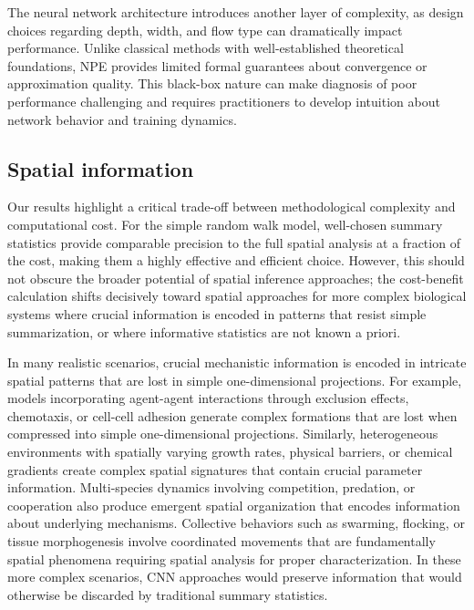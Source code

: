 \documentclass{article}
\begin{document}
The neural network architecture introduces another layer of complexity, as design choices regarding depth, width, and flow type can dramatically impact performance. Unlike classical methods with well-established theoretical foundations, NPE provides limited formal guarantees about convergence or approximation quality. This black-box nature can make diagnosis of poor performance challenging and requires practitioners to develop intuition about network behavior and training dynamics.




\subsection{Spatial information}
Our results highlight a critical trade-off between methodological complexity and computational cost. For the simple random walk model, well-chosen summary statistics provide comparable precision to the full spatial analysis at a fraction of the cost, making them a highly effective and efficient choice. However, this should not obscure the broader potential of spatial inference approaches; the cost-benefit calculation shifts decisively toward spatial approaches for more complex biological systems where crucial information is encoded in patterns that resist simple summarization, or where informative statistics are not known a priori.


In many realistic scenarios, crucial mechanistic information is encoded in intricate spatial patterns that are lost in simple one-dimensional projections. For example, models incorporating agent-agent interactions through exclusion effects, chemotaxis, or cell-cell adhesion generate complex formations that are lost when compressed into simple one-dimensional projections. Similarly, heterogeneous environments with spatially varying growth rates, physical barriers, or chemical gradients create complex spatial signatures that contain crucial parameter information. Multi-species dynamics involving competition, predation, or cooperation also produce emergent spatial organization that encodes information about underlying mechanisms. Collective behaviors such as swarming, flocking, or tissue morphogenesis involve coordinated movements that are fundamentally spatial phenomena requiring spatial analysis for proper characterization. In these more complex scenarios, CNN approaches would preserve information that would otherwise be discarded by traditional summary statistics. 
\end{document}
